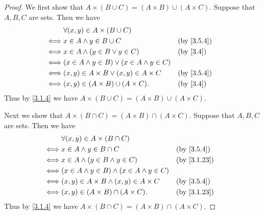 \begin{proof}
  We first show that \(A \times (B \cup C) = (A \times B) \cup (A \times C)\).
  Suppose that \(A, B, C\) are sets.
  Then we have
  \begin{align*}
         & \forall (x, y) \in A \times (B \cup C)                                           \\
    \iff & x \in A \land y \in B \cup C                         &  & \by{3.5.4}             \\
    \iff & x \in A \land (y \in B \lor y \in C)                 &  & \text{(by \cref{3.4})} \\
    \iff & (x \in A \land y \in B) \lor (x \in A \land y \in C)                             \\
    \iff & (x, y) \in A \times B \lor (x, y) \in A \times C     &  & \by{3.5.4}             \\
    \iff & (x, y) \in (A \times B) \cup (A \times C).           &  & \text{(by \cref{3.4})}
  \end{align*}
  Thus by \cref{3.1.4} we have \(A \times (B \cup C) = (A \times B) \cup (A \times C)\).

  Next we show that \(A \times (B \cap C) = (A \times B) \cap (A \times C)\).
  Suppose that \(A, B, C\) are sets.
  Then we have
  \begin{align*}
         & \forall (x, y) \in A \times (B \cap C)                                 \\
    \iff & x \in A \land y \in B \cap C                          &  & \by{3.5.4}  \\
    \iff & x \in A \land (y \in B \land y \in C)                 &  & \by{3.1.23} \\
    \iff & (x \in A \land y \in B) \land (x \in A \land y \in C)                  \\
    \iff & (x, y) \in A \times B \land (x, y) \in A \times C     &  & \by{3.5.4}  \\
    \iff & (x, y) \in (A \times B) \cap (A \times C).            &  & \by{3.1.23}
  \end{align*}
  Thus by \cref{3.1.4} we have \(A \times (B \cap C) = (A \times B) \cap (A \times C)\).


\end{proof}
